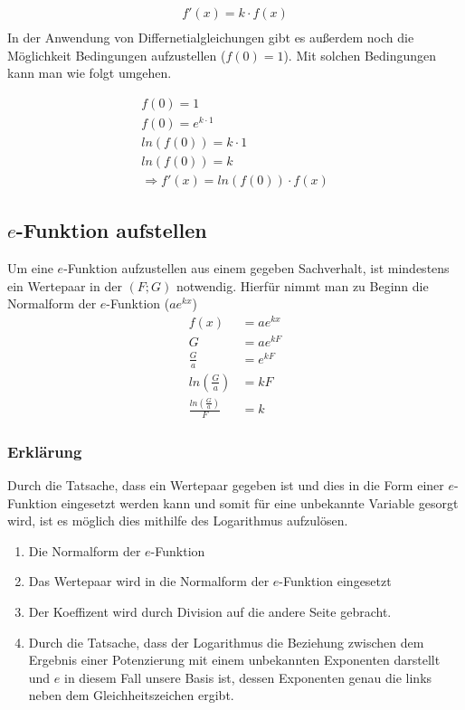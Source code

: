 \begin{beispiel}
	\begin{align*}
		f'(x)=k\cdot f(x)\\
	\end{align*}
In der Anwendung von Differnetialgleichungen gibt es außerdem noch die Möglichkeit Bedingungen aufzustellen ($f(0)=1$). Mit solchen Bedingungen kann man wie folgt umgehen.
\end{beispiel}

\begin{beispiel}
\begin{align*}
	f(0)=1\tag{Bedingung}\\
	f(0)=e^{k\cdot 1}\tag{Nach $k$ auflösen}\\
	ln(f(0))=k\cdot 1\tag{Dividieren durch 1}\\
	ln(f(0))=k\\
	\Rightarrow f'(x)=ln(f(0))\cdot f(x)
\end{align*}
\end{beispiel}

\subsection{$e$-Funktion aufstellen}
Um eine $e$-Funktion aufzustellen aus einem gegeben Sachverhalt, ist mindestens ein Wertepaar in der $(F;G)$ notwendig. Hierfür nimmt man zu Beginn die Normalform der $e$-Funktion ($ae^{kx}$)
\begin{align}
	f(x)&=ae^{kx}\\
	G&=ae^{kF}\\
	\frac{G}{a}&=e^{kF}\\
	ln\left(\frac{G}{a}\right)&=kF\\
	\frac{ln\left(\frac{G}{a}\right)}{F}&=k
\end{align}
\subsubsection{Erklärung}
Durch die Tatsache, dass ein Wertepaar gegeben ist und dies in die Form einer $e$-Funktion eingesetzt werden kann und somit für eine unbekannte Variable gesorgt wird, ist es möglich dies mithilfe des Logarithmus aufzulösen.
\begin{enumerate}
	\item Die Normalform der $e$-Funktion
	\item Das Wertepaar wird in die Normalform der $e$-Funktion eingesetzt
	\item Der Koeffizent wird durch Division auf die andere Seite gebracht. 
	\item Durch die Tatsache, dass der Logarithmus die Beziehung zwischen dem Ergebnis einer Potenzierung mit einem unbekannten Exponenten darstellt und $e$ in diesem Fall unsere Basis ist, dessen Exponenten genau die links neben dem Gleichheitszeichen ergibt. 
\end{enumerate}

